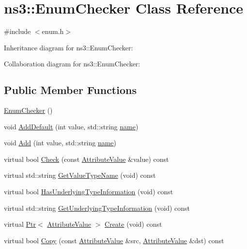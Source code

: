 \hypertarget{classns3_1_1EnumChecker}{}\section{ns3\+:\+:Enum\+Checker Class Reference}
\label{classns3_1_1EnumChecker}


{\ttfamily \#include $<$enum.\+h$>$}



Inheritance diagram for ns3\+:\+:Enum\+Checker\+:


Collaboration diagram for ns3\+:\+:Enum\+Checker\+:
\subsection*{Public Member Functions}
\begin{DoxyCompactItemize}
\item 
\hyperlink{classns3_1_1EnumChecker_a5415d2e1b6c10b8d58357978dad63d92}{Enum\+Checker} ()
\item 
void \hyperlink{classns3_1_1EnumChecker_aa4d61532c12f19223f76defaddefd918}{Add\+Default} (int value, std\+::string \hyperlink{generate__test__data__lte__spectrum__model_8m_ab74e6bf80237ddc4109968cedc58c151}{name})
\item 
void \hyperlink{classns3_1_1EnumChecker_a3ef7fd70db3eced5c44971126e1c0c59}{Add} (int value, std\+::string \hyperlink{generate__test__data__lte__spectrum__model_8m_ab74e6bf80237ddc4109968cedc58c151}{name})
\item 
virtual bool \hyperlink{classns3_1_1EnumChecker_a940e74c38751f7e6e3178a3eca8ad306}{Check} (const \hyperlink{classns3_1_1AttributeValue}{Attribute\+Value} \&value) const 
\item 
virtual std\+::string \hyperlink{classns3_1_1EnumChecker_a681d22d3623fd9aaee4cb86a6a6c0daa}{Get\+Value\+Type\+Name} (void) const 
\item 
virtual bool \hyperlink{classns3_1_1EnumChecker_a7a60b654cef47b54bb557ca311803a17}{Has\+Underlying\+Type\+Information} (void) const 
\item 
virtual std\+::string \hyperlink{classns3_1_1EnumChecker_a3b79700b742c00d6d6aac5267a7803d5}{Get\+Underlying\+Type\+Information} (void) const 
\item 
virtual \hyperlink{classns3_1_1Ptr}{Ptr}$<$ \hyperlink{classns3_1_1AttributeValue}{Attribute\+Value} $>$ \hyperlink{classns3_1_1EnumChecker_a36933011e7d75eadc201c77a1e5d096a}{Create} (void) const 
\item 
virtual bool \hyperlink{classns3_1_1EnumChecker_abe3330d0a850d2cb791b6eef8ad8de49}{Copy} (const \hyperlink{classns3_1_1AttributeValue}{Attribute\+Value} \&src, \hyperlink{classns3_1_1AttributeValue}{Attribute\+Value} \&dst) const 
\end{DoxyCompactItemize}
